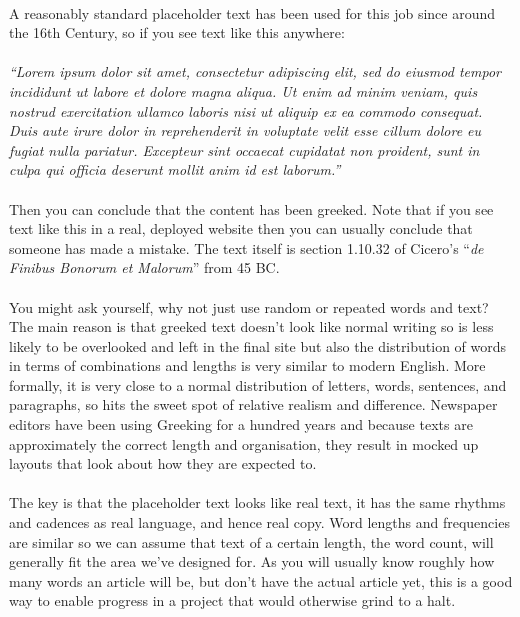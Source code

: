 \paragraph{} A reasonably standard placeholder text has been used for this job since around the 16th Century, so if you see text like this anywhere:
\paragraph{} {\emph{``Lorem ipsum dolor sit amet, consectetur adipiscing elit, sed do eiusmod tempor incididunt ut labore et dolore magna aliqua. Ut enim ad minim veniam, quis nostrud exercitation ullamco laboris nisi ut aliquip ex ea commodo consequat. Duis aute irure dolor in reprehenderit in voluptate velit esse cillum dolore eu fugiat nulla pariatur. Excepteur sint occaecat cupidatat non proident, sunt in culpa qui officia deserunt mollit anim id est laborum.''}}
\paragraph{} Then you can conclude that the content has been greeked. Note that if you see text like this in a real, deployed website then you can usually conclude that someone has made a mistake. The text itself is section 1.10.32 of Cicero's ``{\emph{de Finibus Bonorum et Malorum}}'' from 45 BC.
\paragraph{} You might ask yourself, why not just use random or repeated words and text? The main reason is that greeked text doesn't look like normal writing so is less likely to be overlooked and left in the final site but also the distribution of words in terms of combinations and lengths is very similar to modern English. More formally, it is very close to a normal distribution of letters, words, sentences, and paragraphs, so hits the sweet spot of relative realism and difference. Newspaper editors have been using Greeking for a hundred years and because texts are approximately the correct length and organisation, they result in mocked up layouts that look about how they are expected to.
\paragraph{} The key is that the placeholder text looks like real text, it has the same rhythms and cadences as real language, and hence real copy. Word lengths and frequencies are similar so we can assume that text of a certain length, the word count, will generally fit the area we’ve designed for. As you will usually know roughly how many words an article will be, but don’t have the actual article yet, this is a good way to enable progress in a project that would otherwise grind to a halt.



